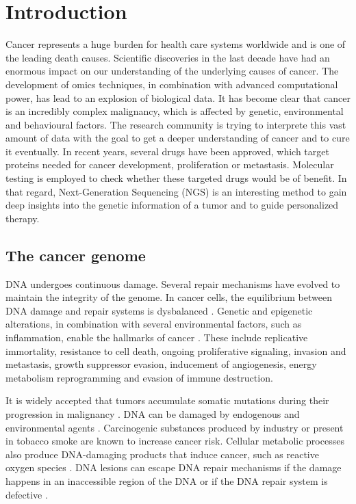 \section{Introduction}

  Cancer represents a huge burden for health care systems worldwide and is one
  of the leading death causes. Scientific discoveries in the last decade have
  had an enormous impact on our understanding of the underlying causes of
  cancer. The development of omics techniques, in combination with advanced
  computational power, has lead to an explosion of biological data. It has
  become clear that cancer is an incredibly complex malignancy, which is
  affected by genetic, environmental and behavioural factors. The research
  community is trying to interprete this vast amount of data with the goal to
  get a deeper understanding of cancer and to cure it eventually. In recent
  years, several drugs have been approved, which target proteins needed for
  cancer development, proliferation or metastasis. Molecular testing is employed
  to check whether these targeted drugs would be of benefit. In that regard,
  Next-Generation Sequencing (NGS) is an interesting method to gain deep
  insights into the genetic information of a tumor and to guide personalized
  therapy.

  \subsection{The cancer genome}

    DNA undergoes continuous damage. Several repair mechanisms have evolved to
    maintain the integrity of the genome. In cancer cells, the equilibrium
    between DNA damage and repair systems is dysbalanced
    {\cite{dna_repair_epidemioloy}}. Genetic and epigenetic alterations, in
    combination with several environmental factors, such as inflammation, enable
    the hallmarks of cancer {\cite{cancer_hallmarks}}. These include replicative
    immortality, resistance to cell death, ongoing proliferative signaling,
    invasion and metastasis, growth suppressor evasion, inducement of
    angiogenesis, energy metabolism reprogramming and evasion of immune
    destruction.

    It is widely accepted that tumors accumulate somatic mutations during their
    progression in malignancy {\cite{accumulation_rates}}
    {\cite{mutations_counting}}. DNA can be damaged by endogenous and
    environmental agents {\cite{multiple_mutations}}. Carcinogenic substances
    produced by industry {\cite{occupational_exposure}} {\cite{rubber_industry}}
    or present in tobacco smoke {\cite{smoking_cancer}} are known to increase
    cancer risk. Cellular metabolic processes also produce DNA-damaging products
    that induce cancer, such as reactive oxygen species {\cite{ros_cancer}}
    {\cite{ros_cancer_other}}. DNA lesions can escape DNA repair mechanisms if
    the damage happens in an inaccessible region of the DNA or if the DNA repair
    system is defective {\cite{dna_repair}}.

